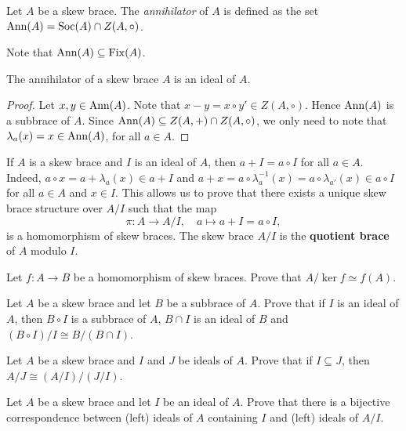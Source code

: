 \begin{definition}
Let $A$ be a skew brace. The \emph{annihilator} of $A$ is 
defined as the set $\operatorname{Ann}(A)=\operatorname{Soc}(A)\cap Z(A,\circ)$. 
\end{definition}

Note that $\operatorname{Ann}(A)\subseteq\operatorname{Fix}(A)$. 

\begin{proposition}
The annihilator of a skew brace $A$ is an ideal of $A$. 
\end{proposition}

\begin{proof}
    Let $x,y\in\operatorname{Ann}(A)$. Note that $x-y=x\circ y'\in Z(A,\circ)$. Hence $\operatorname{Ann}(A)$ is a subbrace of $A$. Since $\operatorname{Ann}(A)\subseteq Z(A,+)\cap Z(A,\circ)$, 
    we only need to note that $\lambda_a(x)=x\in\operatorname{Ann}(A)$, for all $a\in A$. 
\end{proof}




If $A$ is a skew brace and $I$ is an ideal of $A$, then $a+I=a\circ I$ for all $a\in A$. Indeed, 
$a\circ x=a+\lambda_a(x)\in a+I$ and 
$a+x=a\circ\lambda_a^{-1}(x)=a\circ\lambda_{a'}(x)\in a\circ I$ 
for all $a\in A$ and $x\in I$. 
This allows us to prove that there exists a unique skew brace structure over $A/I$ such that
the map 
\[
\pi\colon A\to A/I,
\quad
a\mapsto a+I=a\circ I,
\]
is a homomorphism of skew braces. The skew brace $A/I$ 
is the \textbf{quotient brace} of $A$ modulo $I$. 

\begin{exercise}
\label{xca:iso1}
    Let $f\colon A\to B$ be a homomorphism of skew braces. Prove that $A/\ker f\simeq f(A)$. 
\end{exercise}

\begin{exercise}
\label{xca:iso2}
    Let $A$ be a skew brace and let $B$ be a subbrace of $A$. Prove that if $I$ is an ideal of $A$, 
    then $B\circ I$ is a subbrace of $A$, 
    $B\cap I$ is an ideal of $B$ and $(B\circ I)/I\cong B/(B\cap I)$. 
\end{exercise}

\begin{exercise}
\label{xca:iso3}
Let $A$ be a skew brace and $I$ and $J$ be ideals of $A$. Prove that if $I\subseteq J$, then
$A/J\cong (A/I)/(J/I)$. 
\end{exercise}

\begin{exercise}
\label{xca:correspondence}
Let $A$ be a skew brace and let $I$ be an ideal of $A$. Prove that there is a bijective correspondence between (left) ideals 
of $A$ containing $I$ and (left) ideals of $A/I$. 
\end{exercise}



